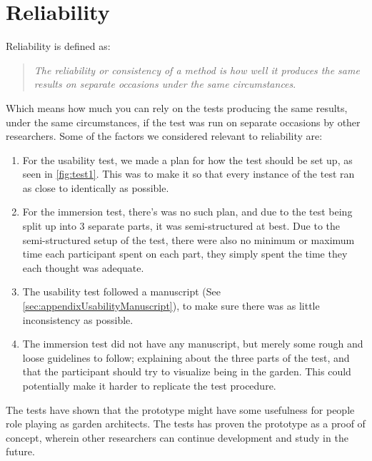 \section*{Reliability}
	Reliability is defined as:\\
	\begin{quote}
		\textit{The reliability or consistency of a method is how well it produces the same results on separate occasions under the same circumstances}\cite{interactionDesign}.\\
	\end{quote}
	Which means how much you can rely on the tests producing the same results, under the same circumstances, if the test was run on separate occasions by other researchers. Some of the factors we considered relevant to reliability are:\\
	\begin{enumerate}
		\item For the usability test, we made a plan for how the test should be set up, as seen in \autoref{fig:test1}. This was to make it so that every instance of the test ran as close to identically as possible.\\
		
		\item For the immersion test, there's was no such plan, and due to the test being split up into 3 separate parts, it was semi-structured at best. Due to the semi-structured setup of the test, there were also no minimum or maximum time each participant spent on each part, they simply spent the time they each thought was adequate.\\
		
		\item The usability test followed a manuscript (See \autoref{sec:appendixUsabilityManuscript}), to make sure there was as little inconsistency as possible.\\
		
		\item The immersion test did not have any manuscript, but merely some rough and loose guidelines to follow; explaining about the three parts of the test, and that the participant should try to visualize being in the garden. This could potentially make it harder to replicate the test procedure.\\
	\end{enumerate}
	The tests have shown that the prototype might have some usefulness for people role playing as garden architects. The tests has proven the prototype as a proof of concept, wherein other researchers can continue development and study in the future.
	

